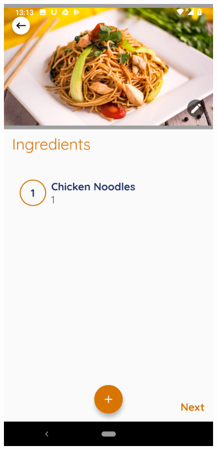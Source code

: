 \documentclass{article}
\begin{document}
    \begin{figure}[h!]
    \centering
    \includegraphics[scale=0.1]{Images/frienod_ingre.jpg}

\end{figure}
\end{document}
